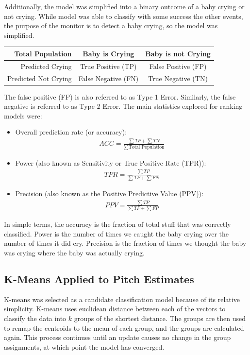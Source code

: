 \documentclass[paper=a4, fontsize=11pt]{scrartcl}
\numberwithin{equation}{section}
\numberwithin{figure}{section}
\numberwithin{table}{section}
\begin{document}
Additionally, the model was simplified into a binary outcome of a baby crying or not crying. While model was able to classify with some success the other events, the purpose of the monitor is to detect a baby crying, so the model was simplified.

\begin{center}
\begin{tabular}{ r | c | c |}
Total Population & Baby is Crying & Baby is not Crying \\\hline
Predicted Crying & \cellcolor{green!25}True Positive (TP) & \cellcolor{red!25}False Positive (FP) \\\hline
Predicted Not Crying & \cellcolor{red!25}False Negative (FN) & \cellcolor{green!25}True Negative (TN)\\\hline
\end{tabular}
\end{center}

The false positive (FP) is also referred to as Type 1 Error. Similarly, the false negative is referred to as Type 2 Error. The main statistics explored for ranking models were:\\
\begin{itemize}
\item Overall prediction rate (or accuracy):
\begin{align*}
ACC = \frac{\sum TP + \sum TN}{\sum \text{Total Population}}
\end{align*}
\item Power (also known as Sensitivity or True Positive Rate (TPR)):
\begin{align*}
TPR = \frac{\sum TP}{\sum TP + \sum FN}
\end{align*}
\item Precision (also known as the Positive Predictive Value (PPV)):
\begin{align*}
PPV = \frac{\sum TP}{\sum TP + \sum FP}
\end{align*}
\end{itemize}

In simple terms, the accuracy is the fraction of total stuff that was correctly classified. Power is the number of times we caught the baby crying over the number of times it did cry. Precision is the fraction of times we thought the baby was crying where the baby was actually crying.

\subsection{K-Means Applied to Pitch Estimates}
K-means was selected as a candidate classification model because of its relative simplicity. K-means uses euclidean distance between each of the vectors to classify the data into $k$ groups of the shortest distance. The groups are then used to remap the centroids to the mean of each group, and the groups are calculated again. This process continues until an update causes no change in the group assignments, at which point the model has converged.
\end{document}
